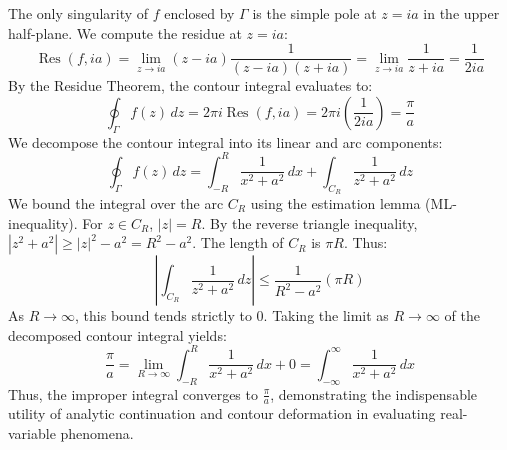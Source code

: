 The only singularity of $f$ enclosed by $\Gamma$ is the simple pole at $z = ia$ in the upper half-plane. We compute the residue at $z = ia$:
$$\operatorname{Res}(f, ia) = \lim_{z \to ia} (z - ia) \frac{1}{(z - ia)(z + ia)} = \lim_{z \to ia} \frac{1}{z + ia} = \frac{1}{2ia}$$
By the Residue Theorem, the contour integral evaluates to:
$$\oint_\Gamma f(z) \, dz = 2\pi i \operatorname{Res}(f, ia) = 2\pi i \left( \frac{1}{2ia} \right) = \frac{\pi}{a}$$
We decompose the contour integral into its linear and arc components:
$$\oint_\Gamma f(z) \, dz = \int_{-R}^R \frac{1}{x^2 + a^2} \, dx + \int_{C_R} \frac{1}{z^2 + a^2} \, dz$$
We bound the integral over the arc $C_R$ using the estimation lemma (ML-inequality). For $z \in C_R$, $|z| = R$. By the reverse triangle inequality, $|z^2 + a^2| \ge |z|^2 - a^2 = R^2 - a^2$. The length of $C_R$ is $\pi R$. Thus:
$$\left| \int_{C_R} \frac{1}{z^2 + a^2} \, dz \right| \le \frac{1}{R^2 - a^2} (\pi R)$$
As $R \to \infty$, this bound tends strictly to $0$. Taking the limit as $R \to \infty$ of the decomposed contour integral yields:
$$\frac{\pi}{a} = \lim_{R \to \infty} \int_{-R}^R \frac{1}{x^2 + a^2} \, dx + 0 = \int_{-\infty}^\infty \frac{1}{x^2 + a^2} \, dx$$
Thus, the improper integral converges to $\frac{\pi}{a}$, demonstrating the indispensable utility of analytic continuation and contour deformation in evaluating real-variable phenomena.